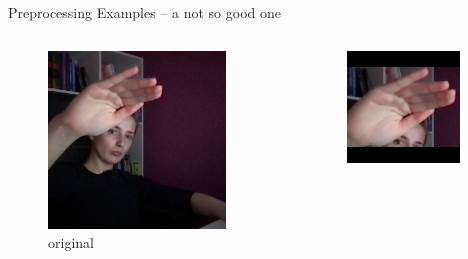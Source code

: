 \documentclass[aspectratio=169]{beamer}
\begin{document}
{\begin{frame}{Preprocessing Examples -- a not so good one}
\begin{columns}[c]
    \begin{column}{.33\textwidth}
    \begin{figure}
        \centering
        \includegraphics[width=0.9\textwidth]{img/test/nasmi_304.png}
        \caption{original}
    \end{figure}      
    \end{column}
    \begin{column}{.33\textwidth}
    \begin{figure}
        \centering
        \includegraphics[width=0.9\textwidth]{img/cropped/nasmi_304.png}

\end{figure}
\end{column}
\end{columns}
\end{frame}}
\end{document}
